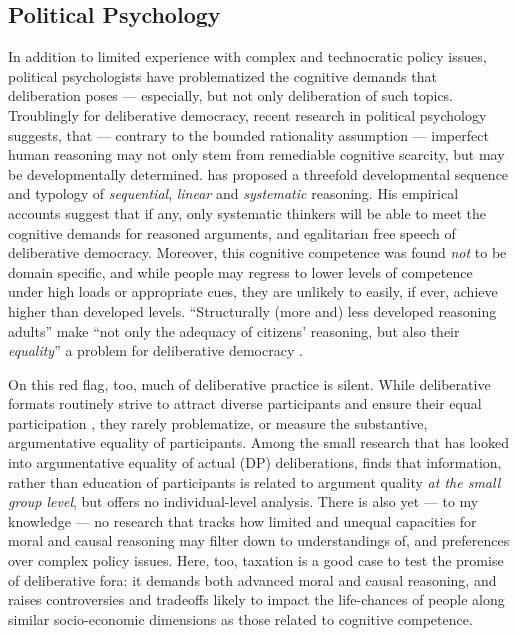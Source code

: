 \subsection{Political Psychology}
In addition to limited experience with complex and technocratic policy issues, political psychologists have problematized the cognitive demands that deliberation poses \citep{Rosenberg-2002-aa} --- especially, but not only deliberation of such topics.
Troublingly for deliberative democracy, recent research in political psychology suggests, that --- contrary to the bounded rationality assumption \citep[for example,][]{Simon-1999-aa,Kahneman2011} --- imperfect human reasoning may not only stem from remediable cognitive scarcity, but may be developmentally determined. 
\citet{Rosenberg-2002-aa} has proposed a threefold developmental sequence and typology of \emph{sequential}, \emph{linear} and \emph{systematic} reasoning. %
His empirical accounts suggest that if any, only systematic thinkers will be able to meet the cognitive demands for reasoned arguments, and egalitarian free speech of deliberative democracy. 
Moreover, this cognitive competence was found \emph{not} to be domain specific, and while people may regress to lower levels of competence under high loads or appropriate cues, they are unlikely to easily, if ever, achieve higher than developed levels. 
``Structurally (more and) less developed reasoning adults'' make ``not only the adequacy of citizens' reasoning, but also their \emph{equality}'' a problem for deliberative democracy \citep[12, emphasis added]{Rosenberg-2007-aa}.

On this red flag, too, much of deliberative practice is silent. 
While deliberative formats routinely strive to attract diverse participants and ensure their equal participation \citep{Fishkin2009}, they rarely problematize, or measure the substantive, argumentative equality of participants. 
Among the small research that has looked into argumentative equality of actual (\gls{DP}) deliberations, \cite{Siu} finds that information, rather than education of participants is related to argument quality \emph{at the small group level}, but offers no individual-level analysis. 
There is also yet --- to my knowledge --- no research that tracks how limited and unequal capacities for moral and causal reasoning may filter down to understandings of, and preferences over complex policy issues.
Here, too, taxation is a good case to test the promise of deliberative fora: it demands both advanced moral and causal reasoning, and raises controversies and tradeoffs likely to impact the life-chances of people along similar socio-economic dimensions as those related to cognitive competence.

